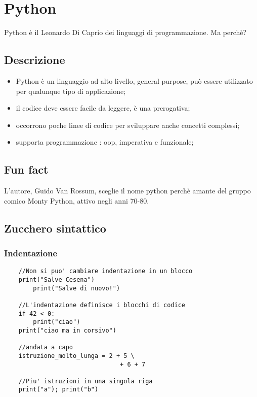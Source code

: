 \chapter{Python}

Python è il Leonardo Di Caprio dei linguaggi di programmazione. Ma perchè?

\section{Descrizione}

\begin{itemize}
	\item Python è un linguaggio ad alto livello, general purpose, può essere utilizzato per qualunque tipo di applicazione;
	\item il codice deve essere facile da leggere, è una prerogativa;
	\item occorrono poche linee di codice per sviluppare anche concetti complessi;
	\item supporta programmazione : oop, imperativa e funzionale;
\end{itemize}

\section{Fun fact}

L'autore, Guido Van Rossum, sceglie il nome python perchè amante del gruppo comico Monty Python, attivo negli anni 70-80. 

\section{Zucchero sintattico}

\subsection{Indentazione}

\begin{lstlisting}
	//Non si puo' cambiare indentazione in un blocco
	print("Salve Cesena")
		print("Salve di nuovo!")
	
	//L'indentazione definisce i blocchi di codice
	if 42 < 0:
		print("ciao")
	print("ciao ma in corsivo")
	
	//andata a capo
	istruzione_molto_lunga = 2 + 5 \
								+ 6 + 7

	//Piu' istruzioni in una singola riga
	print("a"); print("b")
\end{lstlisting}

